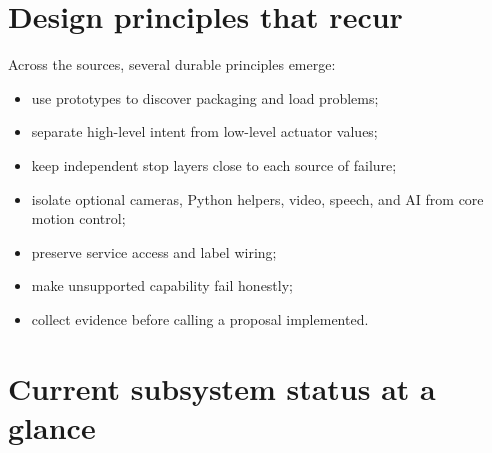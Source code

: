 \documentclass[10pt,openany]{book}
\begin{document}
\section{Design principles that recur}

Across the sources, several durable principles emerge:

\begin{itemize}
  \item use prototypes to discover packaging and load problems;
  \item separate high-level intent from low-level actuator values;
  \item keep independent stop layers close to each source of failure;
  \item isolate optional cameras, Python helpers, video, speech, and AI from core motion control;
  \item preserve service access and label wiring;
  \item make unsupported capability fail honestly;
  \item collect evidence before calling a proposal implemented.
\end{itemize}

\section{Current subsystem status at a glance}
\end{document}
